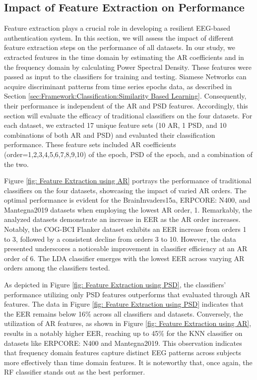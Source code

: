 \subsection{Impact of Feature Extraction on Performance}
Feature extraction plays a crucial role in developing a resilient EEG-based authentication system. In this section, we will assess the impact of different feature extraction steps on the performance of all datasets. In our study, we extracted features in the time domain by estimating the AR coefficients and in the frequency domain by calculating Power Spectral Density. These features were passed as input to the classifiers for training and testing. Siamese Networks can acquire discriminant patterns from time series epochs data, as described in Section \ref{sec:Framework:Classification:Similarity Based Learning}.
Consequently, their performance is independent of the AR and PSD features. Accordingly, this section will evaluate the efficacy of traditional classifiers on the four datasets. For each dataset, we extracted 17 unique feature sets (10 AR, 1 PSD, and 10 combinations of both AR and PSD) and evaluated their classification performance. These feature sets included AR coefficients (order=1,2,3,4,5,6,7,8,9,10) of the epoch, PSD of the epoch, and a combination of the two. 
\smallskip

Figure \ref{fig: Feature Extraction using AR} portrays the performance of traditional classifiers on the four datasets, showcasing the impact of varied AR orders. The optimal performance is evident for the BrainInvaders15a, ERPCORE: N400, and Mantegna2019 datasets when employing the lowest AR order, 1. Remarkably, the analyzed datasets demonstrate an increase in EER as the AR order increases. Notably, the COG-BCI Flanker dataset exhibits an EER increase from orders 1 to 3, followed by a consistent decline from orders 3 to 10. However, the data presented underscores a noticeable improvement in classifier efficiency at an AR order of 6. The LDA classifier emerges with the lowest EER across varying AR orders among the classifiers tested.
\smallskip

As depicted in Figure \ref{fig: Feature Extraction using PSD}, the classifiers' performance utilizing only PSD features outperforms that evaluated through AR features. The data in Figure \ref{fig: Feature Extraction using PSD} indicates that the EER remains below 16$\%$ across all classifiers and datasets. Conversely, the utilization of AR features, as shown in Figure \ref{fig: Feature Extraction using AR}, results in a notably higher EER, reaching up to 45$\%$ for the KNN classifier on datasets like ERPCORE: N400 and Mantegna2019. This observation indicates that frequency domain features capture distinct EEG patterns across subjects more effectively than time domain features. It is noteworthy that, once again, the RF classifier stands out as the best performer. 
\smallskip

